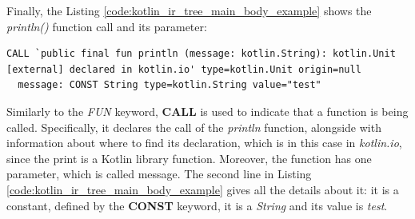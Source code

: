 Finally, the Listing \ref{code:kotlin_ir_tree_main_body_example} shows the \textit{println()} function call and its parameter:
\begin{lstlisting}[caption={Kotlin IR tree of the body block content of the main function in Listing \ref{code:kotlin_for_ir_tree}}, captionpos=b, label={code:kotlin_ir_tree_main_body_example}]
CALL `public final fun println (message: kotlin.String): kotlin.Unit [external] declared in kotlin.io' type=kotlin.Unit origin=null
  message: CONST String type=kotlin.String value="test"
\end{lstlisting}
Similarly to the \textit{FUN} keyword, \textbf{CALL} is used to indicate that a function is being called. Specifically, it declares the call of the \textit{println} function, alongside with information about where to find its declaration, which is in this case in \textit{kotlin.io}, since the print is a Kotlin library function. Moreover, the function has one parameter, which is called message. The second line in Listing \ref{code:kotlin_ir_tree_main_body_example} gives all the details about it: it is a constant, defined by the \textbf{CONST} keyword, it is a \textit{String} and its value is \textit{test}.

